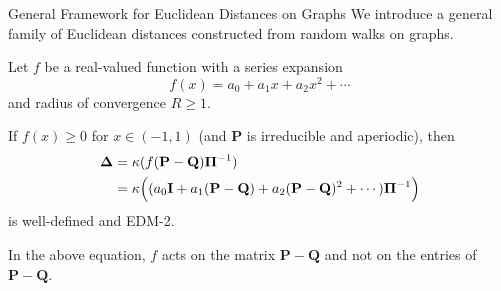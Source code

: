 \documentclass[professionalfonts, hyperref={pdfpagelabels=false,
  colorlinks=true, linkcolor=purple}]{beamer}
\begin{document}
\begin{frame}{General Framework for Euclidean Distances on Graphs}
  We introduce a general family of Euclidean distances constructed
  from random walks on graphs. 
  
  \vskip10pt Let $f$ be a real-valued function with a
    series expansion
    \begin{equation*}
      f(x) = a_0 + a_1 x + a_2 x^2 + \cdots
    \end{equation*}
    and radius of convergence $R \geq 1$. 
  
    \begin{alertblock}{}
      If $f(x) \geq 0$ for $x \in (-1,1)$ (and $\mathbf{P}$
      is irreducible and aperiodic), then
      \begin{equation*}
        \begin{split}
        \bm{\Delta} &= \kappa(f(\mathbf{P} - \mathbf{Q})
        \bm{\Pi}^{-1}) \\ &=
        \kappa\Bigl((a_0
        \mathbf{I} + a_1 (\mathbf{P} - \mathbf{Q}) + a_2 (\mathbf{P} -
        \mathbf{Q})^2 + \cdots)\bm{\Pi}^{-1}\Bigr)
        \end{split}
      \end{equation*}
      is well-defined and EDM-2. 
      \end{alertblock}

      In the above equation, $f$ acts on the
   matrix $\mathbf{P} - \mathbf{Q}$ and not on the entries of
    $\mathbf{P} - \mathbf{Q}$. 
\end{frame}
\end{document}
